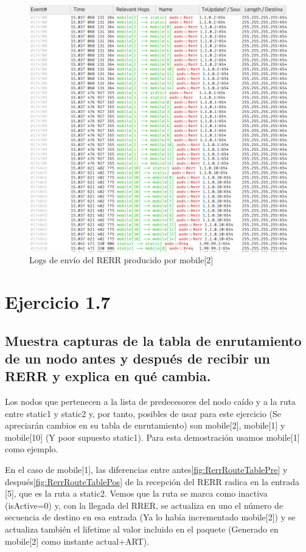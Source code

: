 \begin{figure}[H]
    \centering
    \includegraphics[width=125mm, scale=0.75]{imaxes/aodv/ejercicio6_1.png}
    \caption{Logs de envío del RERR producido por mobile[2]}
    \label{fig:RerrPropagation}
\end{figure}

\vspace{1.25cm}
\section{Ejercicio 1.7} 

\subsection{Muestra capturas de la tabla de enrutamiento de un nodo antes y después de recibir un RERR y explica en
qué cambia.}

Los nodos que pertenecen a la lista de predecesores del nodo caído y a la ruta entre static1 y static2 y, por tanto, posibles de usar para este ejercicio (Se apreciarán cambios en su tabla de enrutamiento) son mobile[2], mobile[1] y mobile[10] (Y poor supuesto static1). Para esta demostración usamos mobile[1] como ejemplo.

En el caso de mobile[1], las diferencias entre antes\ref{fig:RerrRouteTablePre} y después\ref{fig:RerrRouteTablePos} de la recepción del RERR radica en la entrada [5], que es la ruta a static2. Vemos que la ruta se marca como inactiva (isActive=0) y, con la llegada del RRER, se actualiza en uno el número de secuencia de destino en esa entrada (Ya lo había incrementado mobile[2]) y se actualiza también el lifetime al valor incluido en el paquete (Generado en mobile[2] como instante actual+ART).

